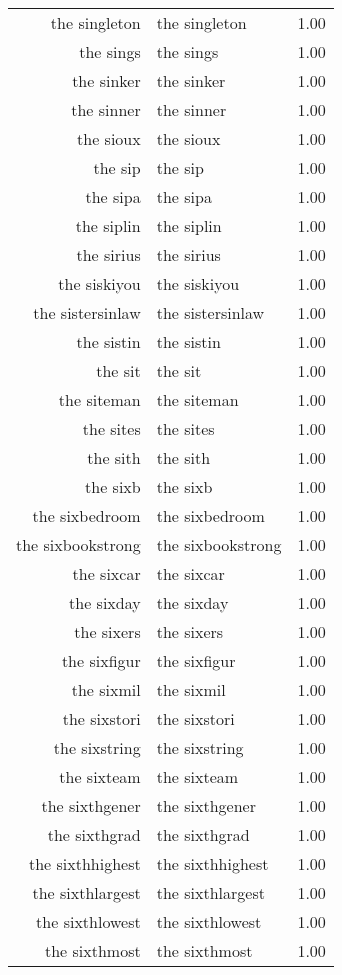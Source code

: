 \begin{table}[ht]
\begin{tabular}{rlr}
  the singleton & the singleton & 1.00 \\ 
  the sings & the sings & 1.00 \\ 
  the sinker & the sinker & 1.00 \\ 
  the sinner & the sinner & 1.00 \\ 
  the sioux & the sioux & 1.00 \\ 
  the sip & the sip & 1.00 \\ 
  the sipa & the sipa & 1.00 \\ 
  the siplin & the siplin & 1.00 \\ 
  the sirius & the sirius & 1.00 \\ 
  the siskiyou & the siskiyou & 1.00 \\ 
  the sistersinlaw & the sistersinlaw & 1.00 \\ 
  the sistin & the sistin & 1.00 \\ 
  the sit & the sit & 1.00 \\ 
  the siteman & the siteman & 1.00 \\ 
  the sites & the sites & 1.00 \\ 
  the sith & the sith & 1.00 \\ 
  the sixb & the sixb & 1.00 \\ 
  the sixbedroom & the sixbedroom & 1.00 \\ 
  the sixbookstrong & the sixbookstrong & 1.00 \\ 
  the sixcar & the sixcar & 1.00 \\ 
  the sixday & the sixday & 1.00 \\ 
  the sixers & the sixers & 1.00 \\ 
  the sixfigur & the sixfigur & 1.00 \\ 
  the sixmil & the sixmil & 1.00 \\ 
  the sixstori & the sixstori & 1.00 \\ 
  the sixstring & the sixstring & 1.00 \\ 
  the sixteam & the sixteam & 1.00 \\ 
  the sixthgener & the sixthgener & 1.00 \\ 
  the sixthgrad & the sixthgrad & 1.00 \\ 
  the sixthhighest & the sixthhighest & 1.00 \\ 
  the sixthlargest & the sixthlargest & 1.00 \\ 
  the sixthlowest & the sixthlowest & 1.00 \\ 
  the sixthmost & the sixthmost & 1.00 \\ 

\end{tabular}
\end{table}
